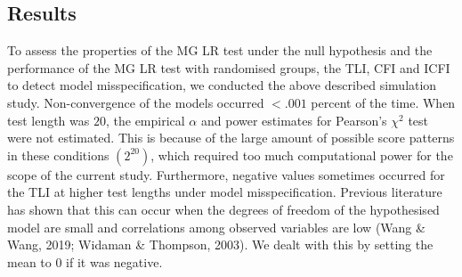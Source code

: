 \documentclass[Royal,sageapa,times,doublespace]{sagej}
\begin{document}
\subsection{Results}
To assess the properties of the MG LR test under the null hypothesis and the performance of the MG LR test with randomised groups, the TLI, CFI and ICFI to detect model misspecification, we conducted the above described simulation study. Non-convergence of the models occurred $<.001$ percent of the time. When test length was $20$, the empirical $\alpha$ and power estimates for Pearson's $\chi^2$ test were not estimated. This is because of the large amount of possible score patterns in these conditions $(2^{20})$, which required too much computational power for the scope of the current study. Furthermore, negative values sometimes occurred for the TLI at higher test lengths under model misspecification. Previous literature has shown that this can occur when the degrees of freedom of the hypothesised model are small and correlations among observed variables are low (Wang \& Wang, 2019; Widaman \& Thompson, 2003). We dealt with this by setting the mean to $0$ if it was negative. \\
\end{document}
